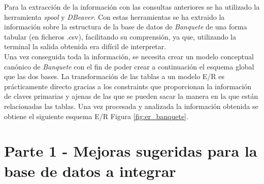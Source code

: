 \documentclass{article}
\begin{document}
Para la extracción de la información con las consultas anteriores se ha utilizado la herramienta \emph{spool} y \emph{DBeaver}. Con estas herramientas se ha extraido la información sobre la estructura de la base de datos de \emph{Banquete} de una forma tabular (en ficheros .csv), facilitando su comprensión, ya que, utilizando la terminal la salida obtenida era difícil de interpretar.\\

Una vez conseguida toda la información, se necesita crear un modelo conceptual canónico de \emph{Banquete} con el fin de poder crear a continuación el esquema global que las dos bases. La transformación de las tablas a un modelo E/R es prácticamente directo gracias a los constraints que proporcionan la información de claves primarias y ajenas de las que se pueden sacar la manera en la que están relacionadas las tablas. Una vez procesada y analizada la información obtenida se obtiene el siguiente esquema E/R Figura \ref{fig:er_banquete}.

\newpage
\section{Parte 1 - Mejoras sugeridas para la base de datos a integrar}\label{mejoras}
\end{document}
